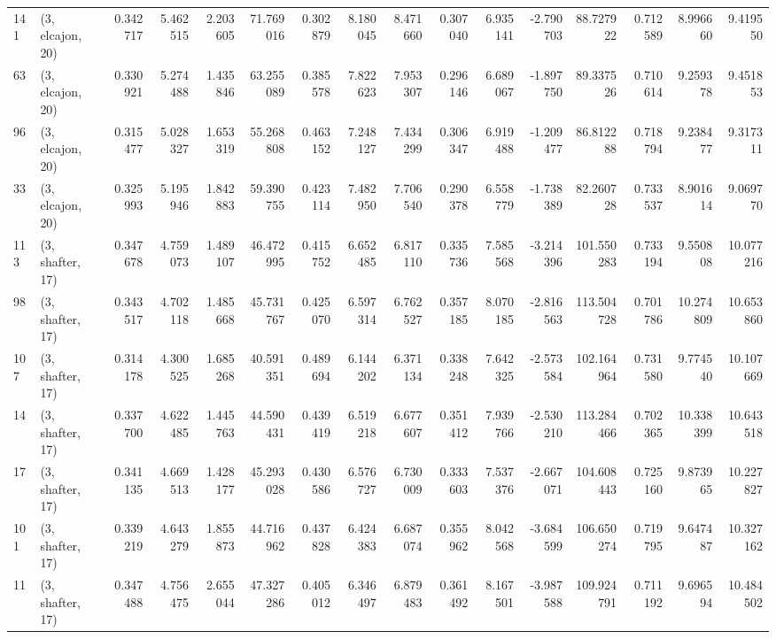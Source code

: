 \begin{tabular}{llrrrrrrrrrrrrrr}
141 &  (3, elcajon, 20) &   0.342717 &   5.462515 &  2.203605 &   71.769016 &  0.302879 &   8.180045 &   8.471660 &  0.307040 &   6.935141 &  -2.790703 &   88.727922 &  0.712589 &   8.996660 &   9.419550 \\
63  &  (3, elcajon, 20) &   0.330921 &   5.274488 &  1.435846 &   63.255089 &  0.385578 &   7.822623 &   7.953307 &  0.296146 &   6.689067 &  -1.897750 &   89.337526 &  0.710614 &   9.259378 &   9.451853 \\
96  &  (3, elcajon, 20) &   0.315477 &   5.028327 &  1.653319 &   55.268808 &  0.463152 &   7.248127 &   7.434299 &  0.306347 &   6.919488 &  -1.209477 &   86.812288 &  0.718794 &   9.238477 &   9.317311 \\
33  &  (3, elcajon, 20) &   0.325993 &   5.195946 &  1.842883 &   59.390755 &  0.423114 &   7.482950 &   7.706540 &  0.290378 &   6.558779 &  -1.738389 &   82.260728 &  0.733537 &   8.901614 &   9.069770 \\
113 &  (3, shafter, 17) &   0.347678 &   4.759073 &  1.489107 &   46.472995 &  0.415752 &   6.652485 &   6.817110 &  0.335736 &   7.585568 &  -3.214396 &  101.550283 &  0.733194 &   9.550808 &  10.077216 \\
98  &  (3, shafter, 17) &   0.343517 &   4.702118 &  1.485668 &   45.731767 &  0.425070 &   6.597314 &   6.762527 &  0.357185 &   8.070185 &  -2.816563 &  113.504728 &  0.701786 &  10.274809 &  10.653860 \\
107 &  (3, shafter, 17) &   0.314178 &   4.300525 &  1.685268 &   40.591351 &  0.489694 &   6.144202 &   6.371134 &  0.338248 &   7.642325 &  -2.573584 &  102.164964 &  0.731580 &   9.774540 &  10.107669 \\
14  &  (3, shafter, 17) &   0.337700 &   4.622485 &  1.445763 &   44.590431 &  0.439419 &   6.519218 &   6.677607 &  0.351412 &   7.939766 &  -2.530210 &  113.284466 &  0.702365 &  10.338399 &  10.643518 \\
17  &  (3, shafter, 17) &   0.341135 &   4.669513 &  1.428177 &   45.293028 &  0.430586 &   6.576727 &   6.730009 &  0.333603 &   7.537376 &  -2.667071 &  104.608443 &  0.725160 &   9.873965 &  10.227827 \\
101 &  (3, shafter, 17) &   0.339219 &   4.643279 &  1.855873 &   44.716962 &  0.437828 &   6.424383 &   6.687074 &  0.355962 &   8.042568 &  -3.684599 &  106.650274 &  0.719795 &   9.647487 &  10.327162 \\
11  &  (3, shafter, 17) &   0.347488 &   4.756475 &  2.655044 &   47.327286 &  0.405012 &   6.346497 &   6.879483 &  0.361492 &   8.167501 &  -3.987588 &  109.924791 &  0.711192 &   9.696594 &  10.484502 \\

\end{tabular}

